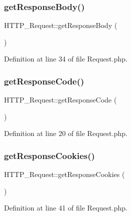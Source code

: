 \subsubsection{\texorpdfstring{get\+Response\+Body()}{getResponseBody()}}
{\footnotesize\ttfamily H\+T\+T\+P\+\_\+\+Request\+::get\+Response\+Body (\begin{DoxyParamCaption}{ }\end{DoxyParamCaption})}



Definition at line 34 of file Request.\+php.

\hypertarget{classHTTP__Request_adca0e2580505791e5ad42f7737568ade}{}\label{classHTTP__Request_adca0e2580505791e5ad42f7737568ade} 
\subsubsection{\texorpdfstring{get\+Response\+Code()}{getResponseCode()}}
{\footnotesize\ttfamily H\+T\+T\+P\+\_\+\+Request\+::get\+Response\+Code (\begin{DoxyParamCaption}{ }\end{DoxyParamCaption})}



Definition at line 20 of file Request.\+php.

\hypertarget{classHTTP__Request_a5fc2cc22a0652620d6866994397f5418}{}\label{classHTTP__Request_a5fc2cc22a0652620d6866994397f5418} 
\subsubsection{\texorpdfstring{get\+Response\+Cookies()}{getResponseCookies()}}
{\footnotesize\ttfamily H\+T\+T\+P\+\_\+\+Request\+::get\+Response\+Cookies (\begin{DoxyParamCaption}{ }\end{DoxyParamCaption})}



Definition at line 41 of file Request.\+php.

\hypertarget{classHTTP__Request_a821d6c29dea6073a0d7f5e414d1237a6}{}\label{classHTTP__Request_a821d6c29dea6073a0d7f5e414d1237a6} 
